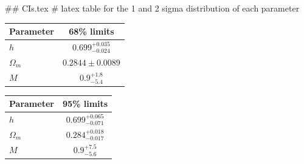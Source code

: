 ## CIs.tex
# latex table for the 1 and 2 sigma distribution of each parameter

\begin{tabular} { l  c}
 Parameter &  68\% limits\\
\hline
{\boldmath$h              $} & $0.699^{+0.035}_{-0.024}   $\\
{\boldmath$\Omega_m       $} & $0.2844\pm 0.0089          $\\
{\boldmath$M              $} & $0.9^{+1.8}_{-5.4}         $\\
\hline
\end{tabular}

\begin{tabular} { l  c}
 Parameter &  95\% limits\\
\hline
{\boldmath$h              $} & $0.699^{+0.065}_{-0.071}   $\\
{\boldmath$\Omega_m       $} & $0.284^{+0.018}_{-0.017}   $\\
{\boldmath$M              $} & $0.9^{+7.5}_{-5.6}         $\\
\hline
\end{tabular}

